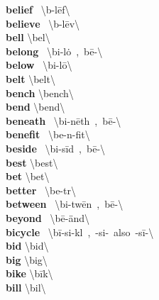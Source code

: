 \documentclass[10pt,a4paper]{article}
\begin{document}
\begin{multicols}{2}
\textbf{ belief }\quad \ \textbackslash b\textschwa -\textprimstress l\={e}f\textbackslash \\
\textbf{ believe }\quad \ \textbackslash b\textschwa -\textprimstress l\={e}v\textbackslash \\
\textbf{ bell }\quad \textbackslash \textprimstress bel\textbackslash \\
\textbf{ belong }\quad \ \textbackslash bi-\textprimstress l\.{o}\engma \ ,\ b\={e}-\textbackslash \\
\textbf{ below }\quad \ \textbackslash bi-\textprimstress l\={o}\textbackslash \\
\textbf{ belt }\quad \textbackslash \textprimstress belt\textbackslash \\
\textbf{ bench }\quad \textbackslash \textprimstress bench\textbackslash \\
\textbf{ bend }\quad \textbackslash \textprimstress bend\textbackslash \\
\textbf{ beneath }\quad \ \textbackslash bi-\textprimstress n\={e}th\ ,\ b\={e}-\textbackslash \\
\textbf{ benefit }\quad \ \textbackslash \textprimstress be-n\textschwa -\textsecstress fit\textbackslash \\
\textbf{ beside }\quad \ \textbackslash bi-\textprimstress s\={i}d\ ,\ b\={e}-\textbackslash \\
\textbf{ best }\quad \textbackslash \textprimstress best\textbackslash \\
\textbf{ bet }\quad \textbackslash \textprimstress bet\textbackslash \\
\textbf{ better }\quad \ \textbackslash \textprimstress be-t\textschwa r\textbackslash \\
\textbf{ between }\quad \ \textbackslash bi-\textprimstress tw\={e}n\ ,\ b\={e}-\textbackslash \\
\textbf{ beyond }\quad \ \textbackslash b\={e}-\textprimstress \"{a}nd\textbackslash \\
\textbf{ bicycle }\quad \ \textbackslash \textprimstress b\={i}-si-k\textschwa l\ ,\ -\textsecstress si-\ also\ -\textsecstress s\={i}-\textbackslash \\
\textbf{ bid }\quad \textbackslash \textprimstress bid\textbackslash \\
\textbf{ big }\quad \textbackslash \textprimstress big\textbackslash \\
\textbf{ bike }\quad \textbackslash \textprimstress b\={i}k\textbackslash \\
\textbf{ bill }\quad \textbackslash \textprimstress bil\textbackslash \\

\end{multicols}
\end{document}
